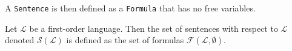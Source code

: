 A \texttt{Sentence} is then defined as a \texttt{Formula} that has no free variables.

\begin{definition}[Sentence]\label{def:sentence}
    \leanok
    Let $\mathcal{L}$ be a first-order language. Then the set of sentences with respect to $\mathcal{L}$ denoted $\mathcal{S}(\mathcal{L})$ is defined as the set of formulas $\mathcal{F}(\mathcal{L},\emptyset)$.
\end{definition}





